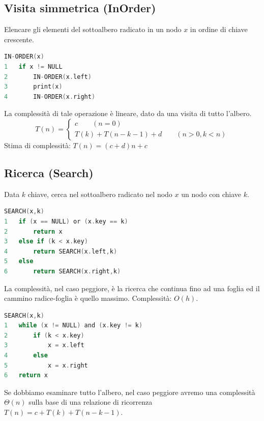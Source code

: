 \subsection{Visita simmetrica (InOrder)}
Elencare gli elementi del sottoalbero radicato in un nodo $x$ in ordine di chiave crescente.
\begin{mdframed}
\begin{lstlisting}[language=C]
IN-ORDER(x)
1   if x != NULL
2       IN-ORDER(x.left)
3       print(x)
4       IN-ORDER(x.right)
\end{lstlisting}
\end{mdframed}
La complessità di tale operazione è lineare, dato da una visita di tutto l'albero.
\begin{equation*}
    T(n) = \begin{cases}
        c \qquad(n=0)\\
        T(k) + T(n-k-1) + d \qquad(n>0, k<n)
    \end{cases}
\end{equation*}
Stima di complessità: $T(n) = (c+d)n + c$

\newpage
\subsection{Ricerca (Search)}
Data $k$ chiave, cerca nel sottoalbero radicato nel nodo $x$ un nodo con chiave $k$.
\begin{mdframed}
\begin{lstlisting}[language=C]
SEARCH(x,k)
1   if (x == NULL) or (x.key == k)
2       return x
3   else if (k < x.key)
4       return SEARCH(x.left,k)
5   else
6       return SEARCH(x.right,k)
\end{lstlisting}
\end{mdframed}
La complessità, nel caso peggiore, è la ricerca che continua fino ad una foglia ed il cammino radice-foglia è quello massimo. Complessità: $O(h)$.
\begin{mdframed}
\begin{lstlisting}[language=C]
SEARCH(x,k)
1   while (x != NULL) and (x.key != k)
2       if (k < x.key)
3           x = x.left
4       else
5           x = x.right
6   return x
\end{lstlisting}
\end{mdframed}
Se dobbiamo esaminare tutto l'albero, nel caso peggiore avremo una complessità $\Theta(n)$ sulla base di una relazione di ricorrenza $T(n) = c + T(k) + T(n-k-1)$. 

